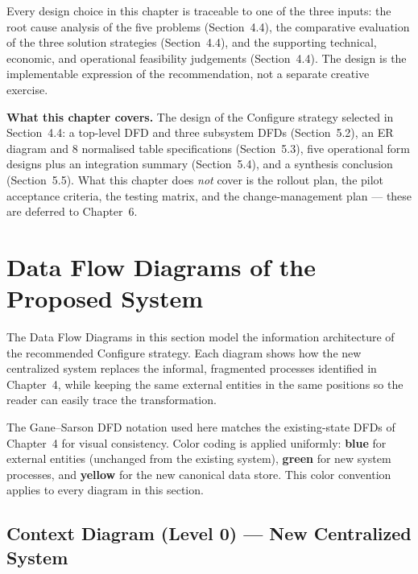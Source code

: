 \documentclass[12pt,a4paper]{report}
\begin{document}
Every design choice in this chapter is traceable to one of the three inputs: the root
cause analysis of the five problems (Section~4.4), the comparative evaluation of the
three solution strategies (Section~4.4), and the supporting technical, economic, and
operational feasibility judgements (Section~4.4). The design is the implementable
expression of the recommendation, not a separate creative exercise.

\begin{highlightBox}
\textbf{What this chapter covers.} The design of the Configure strategy
selected in Section~4.4: a top-level DFD and three subsystem DFDs (Section~5.2),
an ER diagram and 8 normalised table specifications (Section~5.3), five
operational form designs plus an integration summary (Section~5.4), and a
synthesis conclusion (Section~5.5). What this chapter does \emph{not} cover is
the rollout plan, the pilot acceptance criteria, the testing matrix, and the
change-management plan --- these are deferred to Chapter~6.
\end{highlightBox}


\section{Data Flow Diagrams of the Proposed System}
\label{sec:design-dfds}

The Data Flow Diagrams in this section model the information architecture of the
recommended Configure strategy. Each diagram shows how the new centralized system
replaces the informal, fragmented processes identified in Chapter~4, while keeping
the same external entities in the same positions so the reader can easily trace
the transformation.

The Gane--Sarson DFD notation used here matches the existing-state DFDs of
Chapter~4 for visual consistency. Color coding is applied uniformly:
\textbf{blue} for external entities (unchanged from the existing system),
\textbf{green} for new system processes, and \textbf{yellow} for the new canonical
data store. This color convention applies to every diagram in this section.

\subsection{Context Diagram (Level 0) --- New Centralized System}
\label{sec:dfd-context-new}
\end{document}
